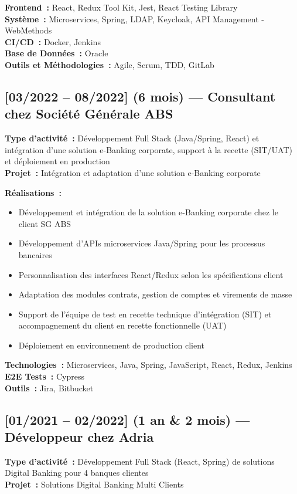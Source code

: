 \textbf{Frontend~:} React, Redux Tool Kit, Jest, React Testing Library\\
\textbf{Système~:} Microservices, Spring, LDAP, Keycloak, API Management - WebMethods\\
\textbf{CI/CD~:} Docker, Jenkins\\
\textbf{Base de Données~:} Oracle\\
\textbf{Outils et Méthodologies~:} Agile, Scrum, TDD, GitLab

\subsection*{[03/2022 -- 08/2022] (6 mois) --- Consultant chez Société Générale ABS}
\vspace{4pt}
\textbf{Type d'activité~:} Développement Full Stack (Java/Spring, React) et intégration d'une solution e-Banking corporate, support à la recette (SIT/UAT) et déploiement en production\\
\textbf{Projet~:} Intégration et adaptation d'une solution e-Banking corporate

\textbf{Réalisations~:}
\begin{itemize}
    \item Développement et intégration de la solution e-Banking corporate chez le client SG ABS
    \item Développement d'APIs microservices Java/Spring pour les processus bancaires
    \item Personnalisation des interfaces React/Redux selon les spécifications client
    \item Adaptation des modules contrats, gestion de comptes et virements de masse
    \item Support de l'équipe de test en recette technique d'intégration (SIT) et accompagnement du client en recette fonctionnelle (UAT)
    \item Déploiement en environnement de production client
\end{itemize}
\textbf{Technologies~:} Microservices, Java, Spring, JavaScript, React, Redux, Jenkins\\
\textbf{E2E Tests~:} Cypress\\
\textbf{Outils~:} Jira, Bitbucket

\subsection*{[01/2021 -- 02/2022] (1 an \& 2 mois) --- Développeur chez Adria}
\vspace{4pt}
\textbf{Type d'activité~:} Développement Full Stack (React, Spring) de solutions Digital Banking pour 4 banques clientes\\
\textbf{Projet~:} Solutions Digital Banking Multi Clients


